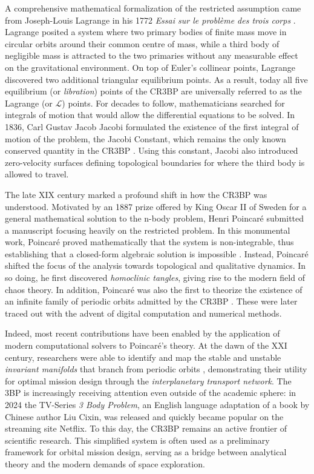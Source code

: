 A comprehensive mathematical formalization of the restricted assumption came from Joseph-Louis Lagrange in his 1772 \emph{Essai sur le problème des trois corps} \cite{lagrange1772essai}. Lagrange posited a system where two primary bodies of finite mass move in circular orbits around their common centre of mass, while a third body of negligible mass is attracted to the two primaries without any measurable effect on the gravitational environment. On top of Euler's collinear points, Lagrange discovered two additional triangular equilibrium points. As a result, today all five equilibrium (or \emph{libration}) points of the CR3BP are universally referred to as the Lagrange (or $\mathcal{L}$) points. For decades to follow, mathematicians searched for integrals of motion that would allow the differential equations to be solved. In 1836, Carl Gustav Jacob Jacobi formulated the existence of the first integral of motion of the problem, the Jacobi Constant, which remains the only known conserved quantity in the CR3BP \cite{jacobi1836mouvement}. Using this constant, Jacobi also introduced zero-velocity surfaces defining topological boundaries for where the third body is allowed to travel.

The late XIX century marked a profound shift in how the CR3BP was understood. Motivated by an 1887 prize offered by King Oscar II of Sweden for a general mathematical solution to the n-body problem, Henri Poincaré submitted a manuscript focusing heavily on the restricted problem. In this monumental work, Poincaré proved mathematically that the system is non-integrable, thus establishing that a closed-form algebraic solution is impossible \cite{poincare1890sur}. Instead, Poincaré shifted the focus of the analysis towards topological and qualitative dynamics. In so doing, he first discovered \emph{homoclinic tangles}, giving rise to the modern field of chaos theory. In addition, Poincaré was also the first to theorize the existence of an infinite family of periodic orbits admitted by the CR3BP \cite{Poincare_1893}. These were later traced out with the advent of digital computation and numerical methods.

Indeed, most recent contributions have been enabled by the application of modern computational solvers to Poincaré's theory.  At the dawn of the XXI century, researchers were able to identify and map the stable and unstable \emph{invariant manifolds} that branch from periodic orbits \cite{koon2000invariant}, demonstrating their utility for optimal mission design through the \emph{interplanetary transport network}. The 3BP is increasingly receiving attention even outside of the academic sphere: in 2024 the TV-Series \emph{3 Body Problem}, an English language adaptation of a book by Chinese author Liu Cixin, was released and quickly became popular on the streaming site Netflix. To this day, the CR3BP remains an active frontier of scientific research. This simplified system is often used as a preliminary framework for orbital mission design, serving as a bridge between analytical theory and the modern demands of space exploration.

